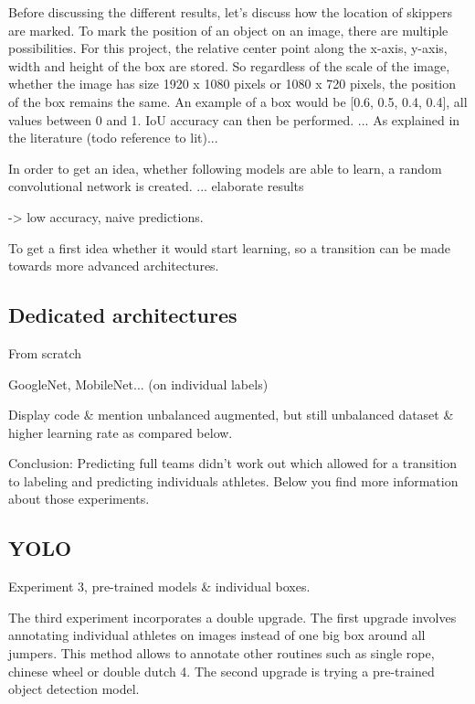 
Before discussing the different results, let's discuss how the location of skippers are marked. To mark the position of an object on an image, there are multiple possibilities.
For this project, the relative center point along the x-axis, y-axis, width and height of the box are stored. So regardless of the scale of the image, whether the image has size 1920 x 1080 pixels or 1080 x 720 pixels, the position of the box remains the same.
An example of a box would be [0.6, 0.5, 0.4, 0.4], all values between 0 and 1. IoU accuracy can then be performed.
... As explained in the literature (todo reference to lit)...

In order to get an idea, whether following models are able to learn, a random convolutional network is created.
... elaborate results %

-> low accuracy, naive predictions.

To get a first idea whether it would start learning, so a transition can be made towards more advanced architectures.

\subsection{Dedicated architectures}

From scratch

GoogleNet, MobileNet... (on individual labels)

Display code \& mention unbalanced augmented, but still unbalanced dataset \& higher learning rate as compared below.

Conclusion:
Predicting full teams didn't work out which allowed for a transition to labeling and predicting individuals athletes. Below you find more information about those experiments.

\subsection{YOLO}

Experiment 3, pre-trained models \& individual boxes.

The third experiment incorporates a double upgrade. The first upgrade involves annotating individual athletes on images instead of one big box around all jumpers. This method allows to annotate other routines such as single rope, chinese wheel or double dutch 4. The second upgrade is trying a pre-trained object detection model.

